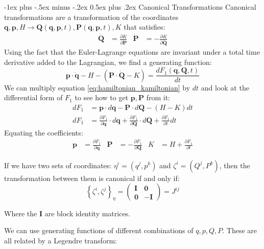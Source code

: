 \documentclass[10pt,landscape]{article}
\makeatletter
\renewcommand{\section}{\@startsection{section}{1}{0mm}%
                                {-1ex plus -.5ex minus -.2ex}%
                                {0.5ex plus .2ex}%
                                {\normalfont\large\bfseries}}
\makeatother
\begin{document}
\begin{multicols}{3}
\section{Canonical Transformations}
Canonical transformations are a transformation of the coordinates $\mathbf{q}, \mathbf{p}, H \rightarrow \mathbf{Q}(\mathbf{q}, \mathbf{p}, t), \mathbf{P}(\mathbf{q}, \mathbf{p}, t), K$ that satisfies:
\begin{align}
	\mathbf{\dot Q}&=\frac{\partial K}{\partial \mathbf{\dot{P}}} & \mathbf{\dot P}&=-\frac{\partial K}{\partial \mathbf{\dot Q}}
\end{align}
Using the fact that the Euler-Lagrange equations are invariant under a total time derivative added to the Lagrangian, we find a generating function:
\begin{equation}
	\mathbf{p}\cdot\mathbf{\dot q}-H-(\mathbf{P}\cdot\mathbf{\dot Q}-K) = \frac{dF_1(\mathbf{q}, \mathbf{Q}, t)}{dt}
\label{eq:hamiltonian_kamiltonian}
\end{equation}
We can multiply equation \ref{eq:hamiltonian_kamiltonian} by $dt$ and look at the differential form of $F_1$ to see how to get $\mathbf{p}, \mathbf{P}$ from it:
\begin{align}
	dF_1 &= \mathbf{p}\cdot d\mathbf{q} - \mathbf{P}\cdot d\mathbf{Q} -(H-K)dt \\
	dF_1 &= \frac{\partial F_1}{\partial \mathbf{q}}\cdot d\mathbf{q} + \frac{\partial F_1}{\partial \mathbf{Q}}\cdot d\mathbf{Q} + \frac{\partial F_1}{\partial t}dt
\end{align}
Equating the coefficients:
\begin{align}
	\mathbf{p} &= \frac{\partial F_1}{\partial \mathbf{q}} & 
	\mathbf{P} &= -\frac{\partial F_1}{\partial \mathbf{Q}} &
	K &= H + \frac{\partial F_1}{\partial t}
\end{align}

If we have two sets of coordinates: $\eta^i = (q^j, p^k)$ and $\zeta^i = (Q^j, P^k)$, then the transformation between them is canonical if and only if:
\begin{equation}
	\left\{\zeta^i, \zeta^j\right\}_{\eta} = 
	\begin{pmatrix}
		\mathbf{I} & \mathbf{0} \\
		\mathbf{0} & -\mathbf{I} 
	\end{pmatrix} = J^{ij}
\end{equation}

Where the $\mathbf{I}$ are block identity matrices.

We can use generating functions of different combinations of $q, p, Q, P$. These are all related by a Legendre transform:


\end{multicols}
\end{document}
